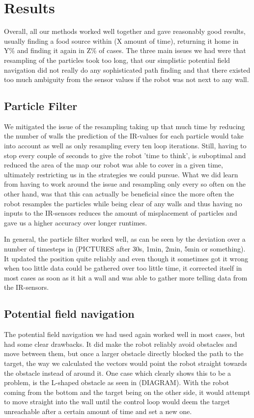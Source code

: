 \documentclass[paper=a4, fontsize=12pt]{scrartcl}	%
\numberwithin{equation}{section}		%
\numberwithin{figure}{section}			%
\numberwithin{table}{section}				%
\begin{document}
\section{Results}
Overall, all our methods worked well together and gave reasonably good results, usually finding a food source within (X amount of time), returning it home in Y\% and finding it again in Z\% of cases. The three main issues we had were that resampling of the particles took too long, that our simplistic potential field navigation did not really do any sophisticated path finding and that there existed too much ambiguity from the sensor values if the robot was not next to any wall.
\subsection{Particle Filter}
We mitigated the issue of the resampling taking up that much time by reducing the number of walls the prediction of the IR-values for each particle would take into account as well as only resampling every ten loop iterations. Still, having to stop every couple of seconds to give the robot 'time to think', is suboptimal and reduced the area of the map our robot was able to cover in a given time, ultimately restricting us in the strategies we could pursue. What we did learn from having to work around the issue and resampling only every so often on the other hand, was that this can actually be beneficial since the more often the robot resamples the particles while being clear of any walls and thus having no inputs to the IR-sensors reduces the amount of misplacement of particles and gave us a higher accuracy over longer runtimes.

In general, the particle filter worked well, as can be seen by the deviation over a number of timesteps in (PICTURES after 30s, 1min, 2min, 5min or something). It updated the position quite reliably and even though it sometimes got it wrong when too little data could be gathered over too little time, it corrected itself in most cases as soon as it hit a wall and was able to gather more telling data from the IR-sensors.

\subsection{Potential field navigation}
The potential field navigation we had used again worked well in most cases, but had some clear drawbacks. It did make the robot reliably avoid obstacles and move between them, but once a larger obstacle directly blocked the path to the target, the way we calculated the vectors would point the robot straight towards the obstacle instead of around it. One case which clearly shows this to be a problem, is the L-shaped obstacle as seen in (DIAGRAM). With the robot coming from the bottom and the target being on the other side, it would attempt to move straight into the wall until the control loop would deem the target unreachable after a certain amount of time and set a new one.
\end{document}
